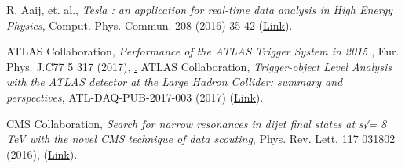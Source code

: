 \documentclass[11pt,letterpaper,fleqn]{article}
\begin{document}
\begin{thebibliography}{9}
R. Aaij, et. al., 
\textit{Tesla : an application for real-time data analysis in High Energy Physics}, 
Comput. Phys. Commun. 208 (2016) 35-42 (\href{https://cds.cern.ch/record/2147693}{Link}).


ATLAS Collaboration, \textit{Performance of the ATLAS Trigger System in 2015} ,
Eur. Phys. J.C77 5 317 (2017),
\href{https://inspirehep.net/record/1500696}. ATLAS Collaboration,
\textit{Trigger-object Level Analysis with the ATLAS detector at the Large Hadron Collider: summary and perspectives}, 
ATL-DAQ-PUB-2017-003 (2017) (\href{https://cds.cern.ch/record/2295739}{Link}).


CMS Collaboration,
\textit{Search for narrow resonances in dijet final states at s√= 8 TeV with the novel CMS technique of data scouting},
Phys. Rev. Lett. 117 031802 (2016), (\href{https://cds.cern.ch/record/2149625}{Link}). 





\end{thebibliography}
\end{document}
